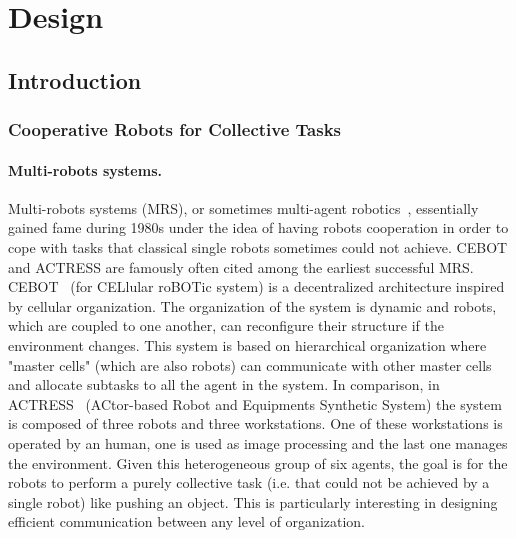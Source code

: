 \chapter{Design}
\label{chapter:design}


\minitoc[n] %

\section{Introduction}

  \subsection{Cooperative Robots for Collective Tasks}

    \subsubsection{Multi-robots systems.} Multi-robots systems (MRS), or sometimes multi-agent robotics~\cite{Dudek1996}, essentially gained fame during 1980s under the idea of having robots cooperation in order to cope with tasks that classical single robots sometimes could not achieve. CEBOT and ACTRESS are famously often cited among the earliest successful MRS. CEBOT~\cite{Fukuda1988} (for CELlular roBOTic system) is a decentralized architecture inspired by cellular organization. The organization of the system is dynamic and robots, which are coupled to one another, can reconfigure their structure if the environment changes. This system is based on hierarchical organization where "master cells" (which are also robots) can communicate with other master cells and allocate subtasks to all the agent in the system. In comparison, in ACTRESS~\cite{Asama1989} (ACtor-based Robot and Equipments Synthetic System) the system is composed of three robots and three workstations. One of these workstations is operated by an human, one is used as image processing and the last one manages the environment. Given this heterogeneous group of six agents, the goal is for the robots to perform a purely collective task (i.e. that could not be achieved by a single robot) like pushing an object. This is particularly interesting in designing efficient communication between any level of organization.

